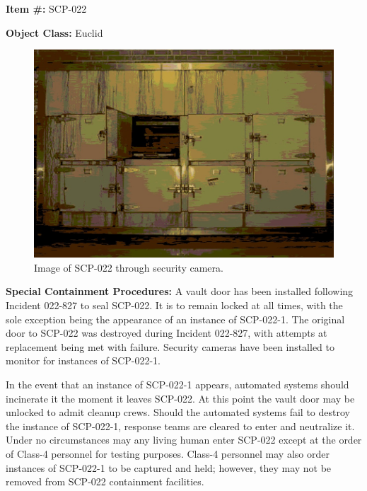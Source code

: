 
\textbf{Item \#:} SCP-022

\textbf{Object Class:} Euclid

\begin{figure}[h]
\begin{center}
\includegraphics[scale=0.4]{scp/022.jpg}
\linebreak Image of SCP-022 through security camera.
\end{center}
\end{figure}

\textbf{Special Containment Procedures:} A vault door has been installed following Incident 022-827 to seal SCP-022. It is to remain locked at all times, with the sole exception being the appearance of an instance of SCP-022-1. The original door to SCP-022 was destroyed during Incident 022-827, with attempts at replacement being met with failure. Security cameras have been installed to monitor for instances of SCP-022-1.

In the event that an instance of SCP-022-1 appears, automated systems should incinerate it the moment it leaves SCP-022. At this point the vault door may be unlocked to admit cleanup crews. Should the automated systems fail to destroy the instance of SCP-022-1, response teams are cleared to enter and neutralize it. Under no circumstances may any living human enter SCP-022 except at the order of Class-4 personnel for testing purposes. Class-4 personnel may also order instances of SCP-022-1 to be captured and held; however, they may not be removed from SCP-022 containment facilities.

